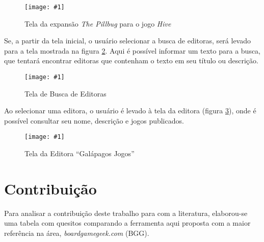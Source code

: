 \documentclass[hidelinks,12pt,article,twocolumn,brazil]{abntex2}
\newcommand{\imagem}[3]{\begin{figure}[htb]
    \begin{center}
        \texttt{[image: \#1]}\\
        \caption{#2}
        \label{#3}
    \end{center}
\end{figure}}
\def\bgg{\textit{boardgamegeek.com}}
\begin{document}
\imagem{img/scr_expansion.png}{Tela da expansão \textit{The Pillbug} para o jogo \textit{Hive}}{scr_scr_expansion}

Se, a partir da tela inicial, o usuário selecionar a busca de editoras, será levado para a tela mostrada na figura \ref{scr_searchpub}. Aqui é possível informar um texto para a busca, que tentará encontrar editoras que contenham o texto em seu título ou descrição.

\imagem{img/scr_searchpub.png}{Tela de Busca de Editoras}{scr_searchpub}

Ao selecionar uma editora, o usuário é levado à tela da editora (figura \ref{scr_publisher}), onde é possível consultar seu nome, descrição e jogos publicados.

\imagem{img/scr_publisher.png}{Tela da Editora ``Galápagos Jogos''}{scr_publisher}

\section{Contribuição}

Para analisar a contribuição deste trabalho para com a literatura, elaborou-se uma tabela com quesitos comparando a ferramenta aqui proposta com a maior referência na área, {\bgg} (BGG).
\end{document}
